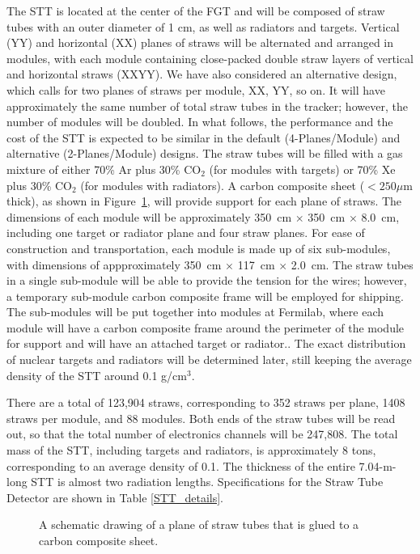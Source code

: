 The STT is located at the center of the FGT and 
will be composed of straw tubes with an outer diameter of 1 cm, as well as 
radiators and targets. 
Vertical (YY) and horizontal (XX) planes of straws will be alternated and 
arranged in modules, with each module containing close-packed double straw layers 
of vertical and horizontal straws (XXYY). 
We have also considered an alternative design, which calls for two planes of straws
per module, XX, YY, so on. It will have approximately the same number of
total straw tubes in the tracker; however, the number of modules will be doubled.
In what follows, the performance and the cost of the STT is expected to be similar 
in the default (4-Planes/Module) and alternative (2-Planes/Module) designs.
The straw tubes will be filled with a
gas mixture of either 70\% Ar plus 30\% CO$_2$ (for modules with targets) or
70\% Xe plus 30\% CO$_2$ (for modules with radiators).
A carbon composite sheet ($< 250 \mu$m thick), as shown in Figure~\ref{STT_film}, 
will provide support for each plane of straws. 
The dimensions of each module will
be approximately 350~cm $\times$ 350~cm $\times$ 8.0~cm, including one
target or radiator plane and four straw planes. For ease of construction and
transportation, each module is made up of six sub-modules, with dimensions of
appproximately 350~cm $\times$ 117~cm $\times$ 2.0~cm. 
The straw tubes in a single sub-module will be able to provide the tension 
for the wires; however, a temporary sub-module carbon composite frame will 
be employed for shipping. The sub-modules will be put together into modules 
at Fermilab, where each module will have a carbon composite frame around 
the perimeter of the module for support and will have an attached target or radiator..
The exact distribution of 
nuclear targets and radiators will be determined later, still keeping the 
average density of the STT around 0.1 g/cm$^3$.  

There are a total of 123,904 straws, corresponding to 352 straws per plane,
1408 straws per module,
and 88 modules. Both ends of the straw tubes will be read out, so that the total
number of electronics channels will be 247,808. 
The total mass of the STT, including targets and radiators, is approximately 8 
tons, corresponding to an average density of 0.1. 
The thickness of the entire 7.04-m-long STT is almost two 
radiation lengths. Specifications for the Straw Tube Detector are shown in Table \ref{STT_details}.

\begin{figure}
\begin{center}
\caption[Plane of straw tubes glued to carbon composite sheet]{\label{STT_film} A schematic drawing of a plane of straw tubes that is
glued to a carbon composite sheet.} 
\end{center}
\end{figure}

